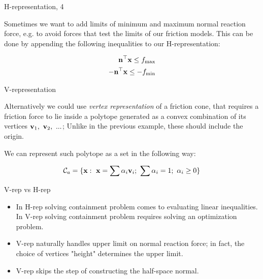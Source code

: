 \documentclass{beamer}
\begin{document}
\begin{frame}{H-representation, 4}
	\begin{flushleft}
		
		Sometimes we want to add limits of minimum and maximum normal reaction force, e.g. to avoid forces that test the limits of our friction models. This can be done by appending the following inequalities to our H-representation:
		
		
		\begin{align}
			\mathbf{n}^\top \mathbf{x} \leq f_{\text{max}}
			\\
			-\mathbf{n}^\top \mathbf{x} \leq -f_{\text{min}}
		\end{align}
		
		
	\end{flushleft}
\end{frame}



\begin{frame}{V-representation}
	\begin{flushleft}
		
		Alternatively we could use \emph{vertex representation} of a friction cone, that requires a friction force to lie inside a polytope generated as a convex combination of its vertices $\mathbf{v}_1, \ \mathbf{v}_2, \ ...$; Unlike in the previous example, these should include the origin.
		
		\bigskip
		
		We can represent such polytope as a set in the following way:
		
		\begin{align}
			\mathcal{C}_a = \{ \mathbf{x}: \ \mathbf{x} = \sum \alpha_i \mathbf{v}_i; \  \sum \alpha_i = 1; \ \alpha_i \geq 0\}
		\end{align}
		
		
		
	\end{flushleft}
\end{frame}



\begin{frame}{V-rep vs H-rep}
	\begin{flushleft}
		
		\begin{itemize}
			\item In H-rep solving containment problem comes to evaluating linear inequalities. In V-rep solving containment problem requires solving an optimization problem.
			
			\item V-rep naturally handles upper limit on normal reaction force; in fact, the choice of vertices "height" determines the upper limit.
			
			\item V-rep skips the step of constructing the half-space normal.
		\end{itemize}
		
	\end{flushleft}
\end{frame}
\end{document}
